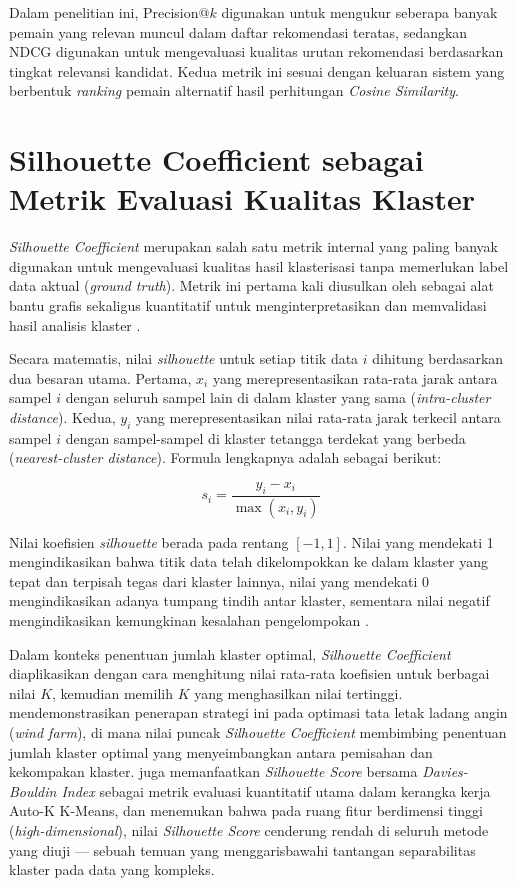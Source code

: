 Dalam penelitian ini, Precision@$k$ digunakan untuk mengukur seberapa banyak pemain yang relevan muncul dalam daftar rekomendasi teratas, sedangkan NDCG digunakan untuk mengevaluasi kualitas urutan rekomendasi berdasarkan tingkat relevansi kandidat. Kedua metrik ini sesuai dengan keluaran sistem yang berbentuk \emph{ranking} pemain alternatif hasil perhitungan \emph{Cosine Similarity}.

\section{Silhouette Coefficient sebagai Metrik Evaluasi Kualitas Klaster}
\label{sec:silhouette}

\emph{Silhouette Coefficient} merupakan salah satu metrik internal yang paling banyak digunakan untuk mengevaluasi kualitas hasil klasterisasi tanpa memerlukan label data aktual (\emph{ground truth}). Metrik ini pertama kali diusulkan oleh \textcite{rousseeuw1987} sebagai alat bantu grafis sekaligus kuantitatif untuk menginterpretasikan dan memvalidasi hasil analisis klaster \parencite{tao2023}.

Secara matematis, nilai \emph{silhouette} untuk setiap titik data $i$ dihitung berdasarkan dua besaran utama. Pertama, $x_i$ yang merepresentasikan rata-rata jarak antara sampel $i$ dengan seluruh sampel lain di dalam klaster yang sama (\emph{intra-cluster distance}). Kedua, $y_i$ yang merepresentasikan nilai rata-rata jarak terkecil antara sampel $i$ dengan sampel-sampel di klaster tetangga terdekat yang berbeda (\emph{nearest-cluster distance}). Formula lengkapnya adalah sebagai berikut:

\begin{equation}
  s_i = \frac{y_i - x_i}{\max(x_i, y_i)}
  \label{eq:silhouette}
\end{equation}

Nilai koefisien \emph{silhouette} berada pada rentang $[-1, 1]$. Nilai yang mendekati 1 mengindikasikan bahwa titik data telah dikelompokkan ke dalam klaster yang tepat dan terpisah tegas dari klaster lainnya, nilai yang mendekati 0 mengindikasikan adanya tumpang tindih antar klaster, sementara nilai negatif mengindikasikan kemungkinan kesalahan pengelompokan \parencite{tao2023}.

Dalam konteks penentuan jumlah klaster optimal, \emph{Silhouette Coefficient} diaplikasikan dengan cara menghitung nilai rata-rata koefisien untuk berbagai nilai $K$, kemudian memilih $K$ yang menghasilkan nilai tertinggi. \textcite{tao2023} mendemonstrasikan penerapan strategi ini pada optimasi tata letak ladang angin (\emph{wind farm}), di mana nilai puncak \emph{Silhouette Coefficient} membimbing penentuan jumlah klaster optimal yang menyeimbangkan antara pemisahan dan kekompakan klaster. \textcite{udhayasuriyan2025} juga memanfaatkan \emph{Silhouette Score} bersama \emph{Davies-Bouldin Index} sebagai metrik evaluasi kuantitatif utama dalam kerangka kerja Auto-K K-Means, dan menemukan bahwa pada ruang fitur berdimensi tinggi (\emph{high-dimensional}), nilai \emph{Silhouette Score} cenderung rendah di seluruh metode yang diuji --- sebuah temuan yang menggarisbawahi tantangan separabilitas klaster pada data yang kompleks.

